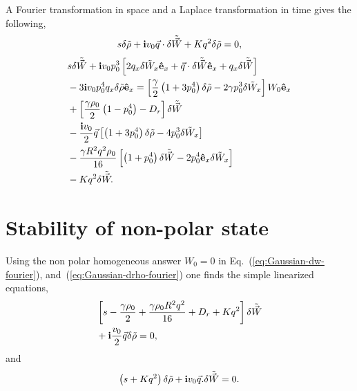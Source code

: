 \documentclass[reprint,floatfix,amsmath,amssymb,aps,pre,showkeys,showpacs,superscriptaddress]{revtex4-1}
\newcommand{\p}{p}
\newcommand{\e}{{\bf \hat{e}}}
\newcommand{\im}{{\rm \bf i}}
\newcommand{\w}{W}
\newcommand{\vw}{\vec{\w}}
\newcommand{\tw}{\tilde{\w}}
\newcommand{\tvw}{\tilde{\vec{\w}}}
\newcommand{\reqs}[2]{Eq.~(\ref{#1}), and~(\ref{#2})}
\begin{document}
A Fourier transformation in space and a Laplace transformation in time gives the following,
\begin{equation}
s \delta \tilde{\rho} + \im v_0 \vec{q}  \cdot \delta \tvw + K q^2 \delta \tilde{\rho} = 0,
\label{eq:Gaussian-drho-fourier}
\end{equation}
\begin{equation}
\begin{aligned}
&s \delta \tvw + \im v_0 \p_0^3 \left[ 2 q_x \delta \tw_x \e_x +  \vec{q} \cdot \delta \tvw \e_x + q_x \delta \tvw \right] \\
&- 3 \im v_0 \p_0^4 q_x \delta \tilde{\rho} \e_x = \left[ \frac{\gamma}{2} \left( 1 + 3 \p_0^4 \right) \delta \tilde{\rho} - 2 \gamma \p_0^3 \delta \tw_x \right] \w_0 \e_x \\
&+\left[ \frac{\gamma \rho_0}{2} \left( 1 - \p_0^4 \right) - D_r  \right] \delta \tvw \\
&- \frac{\im v_0}{2} \vec{q} \left[ \left( 1 + 3 \p_0^4 \right) \delta \tilde{\rho} - 4 \p_0^3 \delta \tw_x \right] \\
&- \frac{\gamma R^2 q^2 \rho_0}{16} \left[ \left( 1+\p_0^4 \right) \delta \tvw - 2 \p_0^4 \e_x \delta \tw_x \right] \\
&- K q^2 \delta \tvw.
\end{aligned}
\label{eq:Gaussian-dw-fourier}
\end{equation}




\section{Stability of non-polar state}
\label{ap:non-polar-stability}

Using the non polar homogeneous answer $\w_0 = 0$ in \reqs{eq:Gaussian-dw-fourier}{eq:Gaussian-drho-fourier} one finds the simple linearized equations,
\begin{equation}
\begin{aligned}
&\left[ s - \frac{\gamma \rho_0}{2} + \frac{\gamma \rho_0 R^2  q^2}{16} + D_r + K q^2 \right]  \delta \tilde{\vw} \\
&+ \im \frac{v_0}{2} \vec{q} \delta \tilde{\rho} = 0,
\end{aligned}
\end{equation}
and
\begin{equation}
\left( s + K q^2 \right) \delta \tilde{\rho} + \im v_0 \vec{q} . \delta \tilde{\vw} = 0.
\end{equation}
\end{document}
